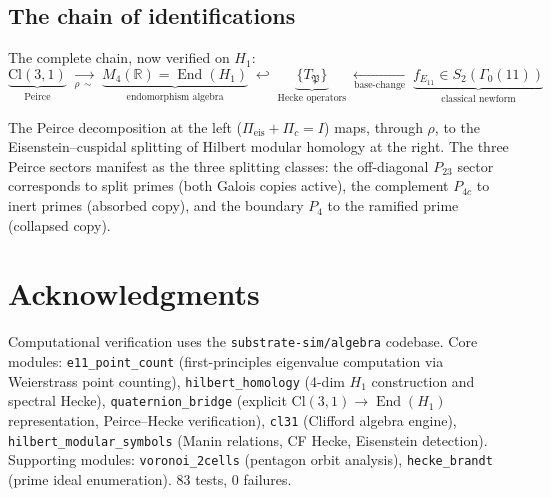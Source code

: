 \documentclass[11pt,a4paper]{article}
\theoremstyle{plain}
\theoremstyle{definition}
\theoremstyle{remark}
\numberwithin{equation}{section}
\providecommand{\Cl}{\mathrm{Cl}}
\providecommand{\RR}{\mathbb{R}}
\providecommand{\fP}{\mathfrak{P}}
\DeclareMathOperator{\End}{End}
\begin{document}
\subsection{The chain of identifications}

The complete chain, now verified on $H_1$:
\[
  \underbrace{\Cl(3,1)}_{\text{Peirce}}
  \;\xrightarrow[\rho\,\sim]{}\;
  \underbrace{M_4(\RR) = \End(H_1)}_{\text{endomorphism algebra}}
  \;\hookleftarrow\;
  \underbrace{\{T_\fP\}}_{\text{Hecke operators}}
  \;\xleftarrow[\text{base-change}]{}\;
  \underbrace{f_{E_{11}} \in S_2(\Gamma_0(11))}_{\text{classical newform}}
\]

The Peirce decomposition at the left ($\Pi_{\mathrm{eis}} + \Pi_c = I$) maps,
through $\rho$, to the Eisenstein--cuspidal splitting of Hilbert modular
homology at the right.  The three Peirce sectors manifest as the three
splitting classes: the off-diagonal $P_{23}$ sector corresponds to split primes
(both Galois copies active), the complement $P_{4c}$ to inert primes
(absorbed copy), and the boundary $P_4$ to the ramified prime (collapsed copy).


\section*{Acknowledgments}

Computational verification uses the \texttt{substrate-sim/algebra} codebase.
Core modules: \texttt{e11\_point\_count} (first-principles eigenvalue
computation via Weierstrass point counting), \texttt{hilbert\_homology}
(4-dim $H_1$ construction and spectral Hecke), \texttt{quaternion\_bridge}
(explicit $\Cl(3,1) \to \End(H_1)$ representation, Peirce--Hecke verification),
\texttt{cl31} (Clifford algebra engine), \texttt{hilbert\_modular\_symbols}
(Manin relations, CF Hecke, Eisenstein detection).  Supporting modules:
\texttt{voronoi\_2cells} (pentagon orbit analysis),
\texttt{hecke\_brandt} (prime ideal enumeration).
83 tests, 0 failures.


\end{document}
